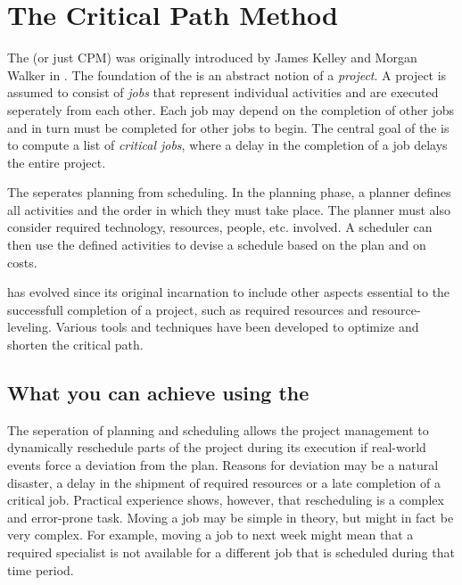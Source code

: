 \section{The Critical Path Method}

The \cpm{} (or just CPM) was originally introduced by James Kelley and Morgan Walker in
\cite{Kelley:1959:CPS:1460299.1460318}. The foundation of the \cpm{} is an abstract notion of a
\emph{project}. A project is assumed to consist of \emph{jobs} that represent individual activities
and are executed seperately from each other. Each job may depend on the completion of other jobs and
in turn must be completed for other jobs to begin. The central goal of the \cpm{} is to compute a list
of \emph{critical jobs}, where a delay in the completion of a job delays the entire project.

The \cpm{} seperates planning from scheduling. In the planning phase, a planner defines all
activities and the order in which they must take place. The planner must also consider required 
technology, resources, people, etc. involved. A scheduler can then use the defined activities to
devise a schedule based on the plan and on costs\cite[p. 161]{Kelley:1959:CPS:1460299.1460318}.

\cpm{} has evolved since its original incarnation to include other aspects essential to the
successfull completion of a project, such as required resources and resource-leveling. Various tools
and techniques have been developed to optimize and shorten the critical path.

\subsection{What you can achieve using the \cpm}
The seperation of planning and scheduling allows the project management to dynamically reschedule
parts of the project during its execution if real-world events force a deviation from the plan.
Reasons for deviation may be a natural disaster, a delay in the shipment of required resources or
a late completion of a critical job. Practical experience shows, however, that rescheduling is a
complex and error-prone task. Moving a job may be simple in theory, but might in fact be very
complex. For example, moving a job to next week might mean that a required specialist is not
available for a different job that is scheduled during that time period.

